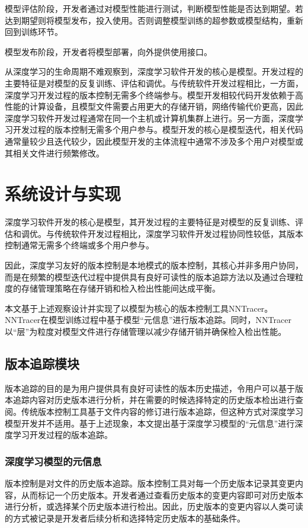 \documentclass{cjc}
\begin{document}
模型评估阶段，开发者通过对模型性能进行测试，判断模型性能是否达到期望。若达到期望则将模型发布，投入使用。否则调整模型训练的超参数或模型结构，重新回到训练环节。

模型发布阶段，开发者将模型部署，向外提供使用接口。

从深度学习的生命周期不难观察到，深度学习软件开发的核心是模型。开发过程的主要特征是对模型的反复训练、评估和调优。与传统软件开发过程相比，一方面，深度学习开发过程的版本控制无需多个终端参与。模型开发相较代码开发依赖于高性能的计算设备，且模型文件需要占用更大的存储开销，网络传输代价更高，因此深度学习软件开发过程通常在同一个主机或计算机集群上进行。另一方面，深度学习开发过程的版本控制无需多个用户参与。模型开发的核心是模型迭代，相关代码通常量较少且迭代较少，因此模型开发的主体流程中通常不涉及多个用户对模型或其相关文件进行频繁修改。

\section{系统设计与实现}
深度学习软件开发的核心是模型，其开发过程的主要特征是对模型的反复训练、评估和调优。与传统软件开发过程相比，深度学习软件开发过程协同性较低，其版本控制通常无需多个终端或多个用户参与。

因此，深度学习友好的版本控制是本地模式的版本控制，其核心并非多用户协同，而是在频繁的模型迭代过程中提供具有良好可读性的版本追踪方法以及通过合理粒度的存储管理策略在存储开销和检入检出性能间达成平衡。

本文基于上述观察设计并实现了以模型为核心的版本控制工具NNTracer。NNTracer在模型训练过程中基于模型“元信息”进行版本追踪。同时，NNTracer以“层”为粒度对模型文件进行存储管理以减少存储开销并确保检入检出性能。

\subsection{版本追踪模块}
版本追踪的目的是为用户提供具有良好可读性的版本历史描述，令用户可以基于版本追踪内容对历史版本进行分析，并在需要的时候选择特定的历史版本检出进行查阅。传统版本控制工具基于文件内容的修订进行版本追踪，但这种方式对深度学习模型开发并不适用。基于上述现象，本文提出基于深度学习模型的“元信息”进行深度学习开发过程的版本追踪。

\subsubsection{深度学习模型的元信息}
版本控制是对文件的历史版本追踪。版本控制工具对每一个历史版本记录其变更内容，从而标记一个历史版本。开发者通过查看历史版本的变更内容即可对历史版本进行分析，或选择某个历史版本进行检出。因此，历史版本的变更内容以人类可读的方式被记录是开发者后续分析和选择特定历史版本的基础条件。
\end{document}
